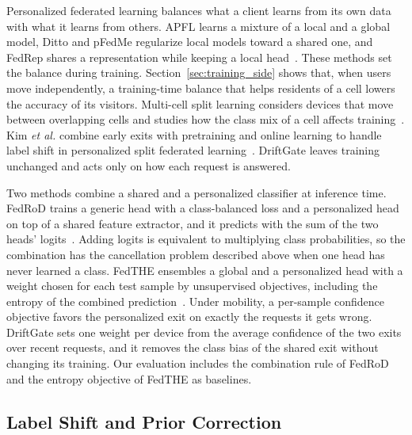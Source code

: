 Personalized federated learning balances what a client learns from its own data with what it learns from others. APFL learns a mixture of a local and a global model, Ditto and pFedMe regularize local models toward a shared one, and FedRep shares a representation while keeping a local head~\cite{deng2020apfl,li2021ditto,tdinh2020pfedme,collins2021fedrep}. These methods set the balance during training. Section~\ref{sec:training_side} shows that, when users move independently, a training-time balance that helps residents of a cell lowers the accuracy of its visitors. Multi-cell split learning considers devices that move between overlapping cells and studies how the class mix of a cell affects training~\cite{rizwan2026splitomc}. Kim \emph{et al.} combine early exits with pretraining and online learning to handle label shift in personalized split federated learning~\cite{kim2025onlinepsfl}. DriftGate leaves training unchanged and acts only on how each request is answered.

Two methods combine a shared and a personalized classifier at inference time. FedRoD trains a generic head with a class-balanced loss and a personalized head on top of a shared feature extractor, and it predicts with the sum of the two heads' logits~\cite{chen2022fedrod}. Adding logits is equivalent to multiplying class probabilities, so the combination has the cancellation problem described above when one head has never learned a class. FedTHE ensembles a global and a personalized head with a weight chosen for each test sample by unsupervised objectives, including the entropy of the combined prediction~\cite{jiang2023fedthe}. Under mobility, a per-sample confidence objective favors the personalized exit on exactly the requests it gets wrong. DriftGate sets one weight per device from the average confidence of the two exits over recent requests, and it removes the class bias of the shared exit without changing its training. Our evaluation includes the combination rule of FedRoD and the entropy objective of FedTHE as baselines.

\subsection{Label Shift and Prior Correction}

